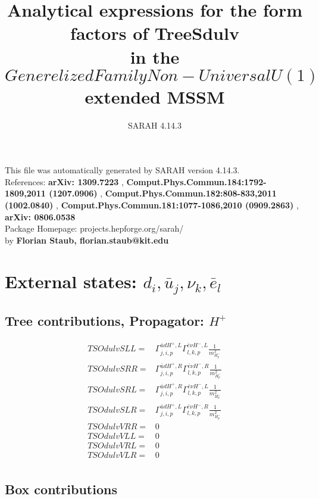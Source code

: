 \documentclass[A4,landscape]{article}
\begin{document}
\title{Analytical expressions for the form factors of TreeSdulv\\ in the $Generelized Family Non-Universal U(1)$ extended MSSM } 
 \author{SARAH 4.14.3} 
 \maketitle 
 \vspace{10cm} 
This file was automatically generated by SARAH version 4.14.3.  \\ 
References: {\bf arXiv: 1309.7223 }, {\bf Comput.Phys.Commun.184:1792-1809,2011 (1207.0906) }, {\bf Comput.Phys.Commun.182:808-833,2011 (1002.0840) }, {\bf Comput.Phys.Commun.181:1077-1086,2010 (0909.2863) }, {\bf arXiv: 0806.0538 } \\ 
Package Homepage: projects.hepforge.org/sarah/ \\ 
by {\bf Florian Staub, florian.staub@kit.edu} 
 \pagebreak 
 \tableofcontents 
 \pagebreak 
\section{External states: ${d_{{i}}, \bar{u}_{{j}}, \nu_{{k}}, \bar{e}_{{l}}}$} 
\subsection{Tree contributions, Propagator: $H^+$} 

\begin{align} 
  TSOdulvSLL= & \Gamma^{\bar{u}d H^+,L}_{j, i, p} \Gamma^{\bar{e}\nu H^- ,L}_{l, k, p} \frac{1}{m^2_{H^-_{{p}}}} \\ 
  TSOdulvSRR= & \Gamma^{\bar{u}d H^+,R}_{j, i, p} \Gamma^{\bar{e}\nu H^- ,R}_{l, k, p} \frac{1}{m^2_{H^-_{{p}}}} \\ 
  TSOdulvSRL= & \Gamma^{\bar{u}d H^+,R}_{j, i, p} \Gamma^{\bar{e}\nu H^- ,L}_{l, k, p} \frac{1}{m^2_{H^-_{{p}}}} \\ 
  TSOdulvSLR= & \Gamma^{\bar{u}d H^+,L}_{j, i, p} \Gamma^{\bar{e}\nu H^- ,R}_{l, k, p} \frac{1}{m^2_{H^-_{{p}}}} \\ 
  TSOdulvVRR= & 0 \\ 
  TSOdulvVLL= & 0 \\ 
  TSOdulvVRL= & 0 \\ 
  TSOdulvVLR= & 0 \\ 
\end{align} 
\subsection{Box contributions} 
\end{document}
